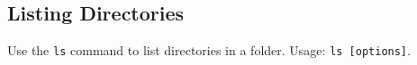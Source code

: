 \subsection{Listing Directories}
Use the \texttt{ls} command to list directories in a folder. Usage: \texttt{ls [options]}.

